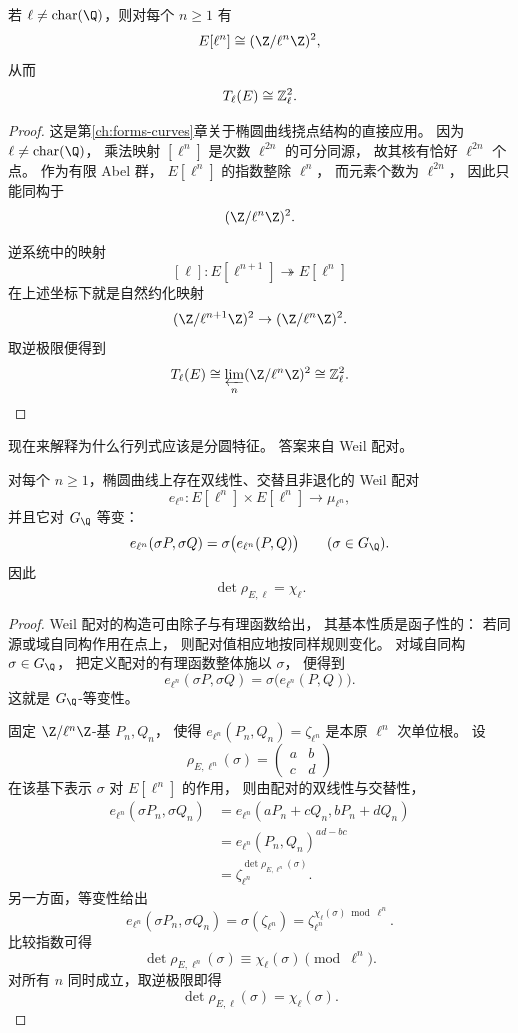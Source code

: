 \begin{proposition}
\label{prop:ch09-tate-rank-two}
若 $\ell\neq \operatorname{char}(\Q)$，则对每个 $n\ge 1$ 有
\[
  E[\ell^n]\cong (\Z/\ell^n\Z)^2,
\]
从而
\[
  T_\ell(E)\cong \mathbb{Z}_\ell^2.
\]
\end{proposition}

\begin{proof}
这是第\ref{ch:forms-curves}章关于椭圆曲线挠点结构的直接应用。
因为 $\ell\neq \operatorname{char}(\Q)$，
乘法映射 $[\ell^n]$ 是次数 $\ell^{2n}$ 的可分同源，
故其核有恰好 $\ell^{2n}$ 个点。
作为有限 Abel 群，
$E[\ell^n]$ 的指数整除 $\ell^n$，
而元素个数为 $\ell^{2n}$，
因此只能同构于
\[
  (\Z/\ell^n\Z)^2.
\]

逆系统中的映射
\[
  [\ell]\colon E[\ell^{n+1}]\twoheadrightarrow E[\ell^n]
\]
在上述坐标下就是自然约化映射
\[
  (\Z/\ell^{n+1}\Z)^2\to (\Z/\ell^n\Z)^2.
\]
取逆极限便得到
\[
  T_\ell(E)\cong \varprojlim_n (\Z/\ell^n\Z)^2\cong \Zl^2.
\]
\end{proof}

现在来解释为什么行列式应该是分圆特征。
答案来自 Weil 配对。

\begin{theorem}
\label{thm:ch09-weil-pairing-det}
对每个 $n\ge 1$，椭圆曲线上存在双线性、交替且非退化的 Weil 配对
\[
  e_{\ell^n}\colon E[\ell^n]\times E[\ell^n]\to \mu_{\ell^n},
\]
并且它对 $G_\Q$ 等变：
\[
  e_{\ell^n}(\sigma P,\sigma Q)=\sigma\bigl(e_{\ell^n}(P,Q)\bigr)
  \qquad (\sigma\in G_\Q).
\]
因此
\[
  \det\rho_{E,\ell}=\chi_\ell.
\]
\end{theorem}

\begin{proof}
Weil 配对的构造可由除子与有理函数给出，
其基本性质是函子性的：
若同源或域自同构作用在点上，
则配对值相应地按同样规则变化。
对域自同构 $\sigma\in G_\Q$，
把定义配对的有理函数整体施以 $\sigma$，
便得到
\[
  e_{\ell^n}(\sigma P,\sigma Q)=\sigma\bigl(e_{\ell^n}(P,Q)\bigr).
\]
这就是 $G_\Q$-等变性。

固定 $\Z/\ell^n\Z$-基 $P_n,Q_n$，
使得 $e_{\ell^n}(P_n,Q_n)=\zeta_{\ell^n}$ 是本原 $\ell^n$ 次单位根。
设
\[
  \rho_{E,\ell^n}(\sigma)=
  \begin{pmatrix}
    a&b\\ c&d
  \end{pmatrix}
\]
在该基下表示 $\sigma$ 对 $E[\ell^n]$ 的作用，
则由配对的双线性与交替性，
\begin{align*}
  e_{\ell^n}(\sigma P_n,\sigma Q_n)
  &=e_{\ell^n}(aP_n+cQ_n,bP_n+dQ_n)\\
  &=e_{\ell^n}(P_n,Q_n)^{ad-bc}\\
  &=\zeta_{\ell^n}^{\det \rho_{E,\ell^n}(\sigma)}.
\end{align*}
另一方面，等变性给出
\[
  e_{\ell^n}(\sigma P_n,\sigma Q_n)=\sigma(\zeta_{\ell^n})
  =\zeta_{\ell^n}^{\chi_\ell(\sigma)\bmod \ell^n}.
\]
比较指数可得
\[
  \det \rho_{E,\ell^n}(\sigma)\equiv \chi_\ell(\sigma)\pmod{\ell^n}.
\]
对所有 $n$ 同时成立，取逆极限即得
\[
  \det\rho_{E,\ell}(\sigma)=\chi_\ell(\sigma).
\]
\end{proof}

